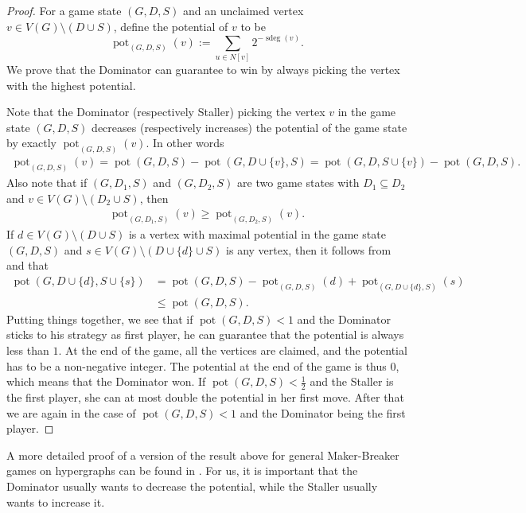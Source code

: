\documentclass[a4paper,11pt,oneside]{scrartcl}
\theoremstyle{definition}
\theoremstyle{remark}
\DeclareMathOperator{\pot}{pot}
\DeclareMathOperator{\gsdeg}{sdeg}
\begin{document}
\begin{proof}
    For a game state $(G,D,S)$ and an unclaimed vertex $v \in V(G) \setminus (D \cup S)$, define the potential of $v$ to be 
    \[\pot_{(G,D,S)}(v) := \sum_{u\in N[v]} 2^{-\gsdeg(v)}.\]
    We prove that the Dominator can guarantee to win by always picking the vertex with the highest potential.
    
    Note that the Dominator (respectively Staller) picking the vertex $v$ in the game state $(G,D,S)$ decreases (respectively increases) the potential of the game state by exactly $\pot_{(G,D,S)}(v)$. In other words
    \begin{align}\label{align:pot_change}
        \pot_{(G,D,S)}(v) = \pot(G,D,S) - \pot(G,D \cup \{v\},S) = \pot(G,D,S \cup \{v\}) - \pot(G,D,S). 
    \end{align}
    Also note that if $(G,D_1,S)$ and $(G,D_2,S)$ are two game states with $D_1 \subseteq D_2$ and $v \in V(G) \setminus (D_2 \cup S)$, then 
    \begin{align}\label{align:pot_monotone}
        \pot_{(G,D_1,S)}(v) \geq \pot_{(G,D_2,S)}(v).
    \end{align}
    If $d \in V(G) \setminus (D \cup S)$ is a vertex with maximal potential in the game state $(G,D,S)$ and $s \in V(G) \setminus (D \cup \{d\}\cup S)$ is any vertex, then it follows from  and  that
    \begin{align*}
        \pot(G,D\cup \{d\}, S \cup \{s\}) &= \pot(G,D,S) - \pot_{(G,D,S)}(d) + \pot_{(G,D\cup \{d\},S)}(s)\\ 
        &\leq \pot(G,D,S).
    \end{align*}
    Putting things together, we see that if $\pot(G,D,S) < 1$ and the Dominator sticks to his strategy as first player, he can guarantee that the potential is always less than $1$. At the end of the game, all the vertices are claimed, and the potential has to be a non-negative integer. The potential at the end of the game is thus $0$, which means that the Dominator won. If $\pot(G,D,S) < \frac12$ and the Staller is the first player, she can at most double the potential in her first move. After that we are again in the case of $\pot(G,D,S) < 1$ and the Dominator being the first player. 
\end{proof}
A more detailed proof of a version of the result above for general Maker-Breaker games on hypergraphs can be found in \cite[Theorem 2.3.3]{HKSS}. For us, it is important that the Dominator usually wants to decrease the potential, while the Staller usually wants to increase it.
\end{document}
